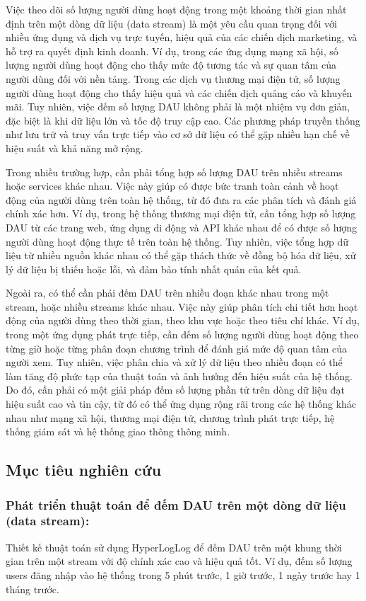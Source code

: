 \documentclass[a4paper,13pt]{article}
\theoremstyle{mytheor}
\begin{document}
Việc theo dõi số lượng người dùng hoạt động trong một khoảng thời gian nhất định trên một dòng dữ liệu (data stream) 
là một yêu cầu quan trọng đối với nhiều ứng dụng và dịch vụ trực tuyến, hiệu quả của các chiến dịch marketing, 
và hỗ trợ ra quyết định kinh doanh. Ví dụ, trong các ứng dụng mạng xã hội, số lượng người dùng hoạt động cho thấy mức độ tương tác 
và sự quan tâm của người dùng đối với nền tảng. Trong các dịch vụ thương mại điện tử, số lượng người dùng hoạt động cho thấy hiệu quả 
và các chiến dịch quảng cáo và khuyến mãi. Tuy nhiên, việc đếm số lượng DAU không phải là một nhiệm vụ đơn giản, đặc biệt là khi dữ liệu lớn 
và tốc độ truy cập cao. Các phương pháp truyền thống như lưu trữ và truy vấn trực tiếp vào cơ sở dữ liệu có thể gặp nhiều hạn chế về hiệu suất 
và khả năng mở rộng.

Trong nhiều trường hợp, cần phải tổng hợp số lượng DAU trên nhiều streams hoặc services khác nhau. Việc này giúp có được bức tranh toàn cảnh về hoạt động của người dùng trên toàn hệ thống, từ đó đưa ra các phân tích và đánh giá chính xác hơn. Ví dụ, trong hệ thống thương mại điện tử, cần tổng hợp số lượng DAU từ các trang web, ứng dụng di động và API khác nhau để có được số lượng người dùng hoạt động thực tế trên toàn hệ thống. Tuy nhiên, việc tổng hợp dữ liệu từ nhiều nguồn khác nhau có thể gặp thách thức về đồng bộ hóa dữ liệu, xử lý dữ liệu bị thiếu hoặc lỗi, và đảm bảo tính nhất quán của kết quả. 

Ngoài ra, có thể cần phải đếm DAU trên nhiều đoạn khác nhau trong một stream, hoặc nhiều streams khác nhau. Việc này giúp phân tích chi tiết hơn hoạt động của người dùng theo thời gian, theo khu vực hoặc theo tiêu chí khác. Ví dụ, trong một ứng dụng phát trực tiếp, cần đếm số lượng người dùng hoạt động theo từng giờ hoặc từng phân đoạn chương trình để đánh giá mức độ quan tâm của người xem. Tuy nhiên, việc phân chia và xử lý dữ liệu theo nhiều đoạn có thể làm tăng độ phức tạp của thuật toán và ảnh hưởng đến hiệu suất của hệ thống. Do đó, cần phải có một giải pháp đếm số lượng phần tử trên dòng dữ liệu đạt hiệu suất cao và tin cậy, từ đó có thể ứng dụng rộng rãi trong các hệ thống khác nhau như mạng xã hội, thương mại điện tử, chương trình phát trực tiếp, hệ thống giám sát và hệ thống giao thông thông minh.

\subsection{Mục tiêu nghiên cứu }
\subsubsection{Phát triển thuật toán để đếm DAU trên một dòng dữ liệu (data stream):}
Thiết kế thuật toán sử dụng HyperLogLog để đếm DAU trên một khung thời gian trên một stream với độ chính xác cao và hiệu quả tốt. Ví dụ, đếm số lượng users đăng nhập vào hệ thống trong 5 phút trước, 1 giờ trước, 1 ngày trước hay 1 tháng trước.
\end{document}
